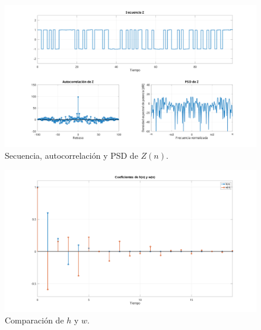 \begin{figure}[h]
	\centering
	\includegraphics[width=1\linewidth]{img/ej3_z.pdf}
	\caption{Secuencia, autocorrelación y PSD de $Z(n)$.}
	\label{fig:ej3_z}
\end{figure}

\begin{figure}[h]
	\centering
	\includegraphics[width=1\linewidth]{img/ej3_coef.pdf}
	\caption{Comparación de $h$ y $w$.}
	\label{fig:ej3_coef}
\end{figure}